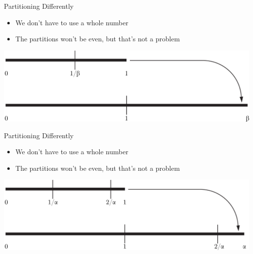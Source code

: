 \documentclass{beamer}
\begin{document}
          \begin{frame}{Partitioning Differently}
            \begin{itemize}
              \item We don't have to use a whole number
              \item The partitions won't be even, but that's not a problem
            \end{itemize}
            \includegraphics[width=\textwidth]{images/partitioning/partitioningbeta}
          \end{frame}

          \begin{frame}{Partitioning Differently}
            \begin{itemize}
              \item We don't have to use a whole number
              \item The partitions won't be even, but that's not a problem
            \end{itemize}
            \includegraphics[width=\textwidth]{images/partitioning/partitioningalpha}
          \end{frame}





\end{document}
